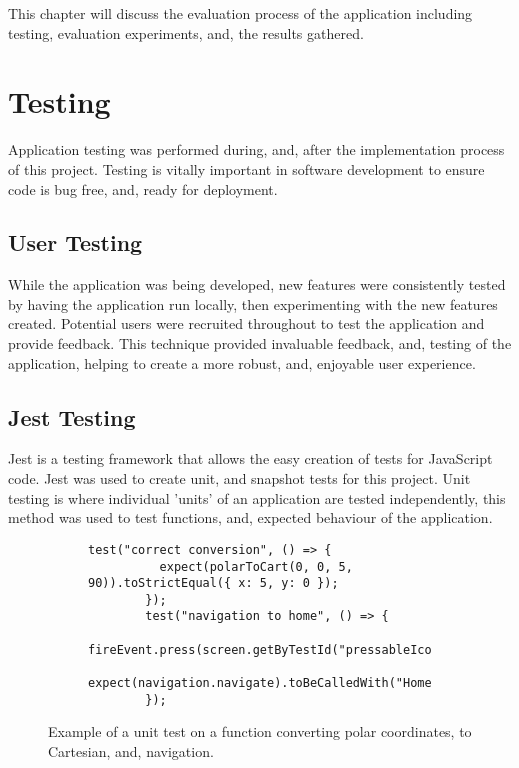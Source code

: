 This chapter will discuss the evaluation process of the application including testing, evaluation experiments, and, the results gathered.

\section{Testing}
Application testing was performed during, and, after the implementation process of this project. Testing is vitally important in software development to ensure code is bug free, and, ready for deployment.

\subsection{User Testing}
While the application was being developed, new features were consistently tested by having the application run locally, then experimenting with the new features created. Potential users were recruited throughout to test the application and provide feedback. This technique provided invaluable feedback, and, testing of the application, helping to create a more robust, and, enjoyable user experience.

\subsection{Jest Testing}
Jest is a testing framework that allows the easy creation of tests for JavaScript code. Jest was used to create unit, and snapshot tests for this project. Unit testing is where individual 'units' of an application are tested independently, this method was used to test functions, and, expected behaviour of the application. 

\begin{figure}[!htbp]
    \centering
    \begin{subfigure}[b]{0.8\textwidth}
        \begin{lstlisting}[language=jsJsx]
        test("correct conversion", () => {
          expect(polarToCart(0, 0, 5, 90)).toStrictEqual({ x: 5, y: 0 });
        });
        test("navigation to home", () => {
            fireEvent.press(screen.getByTestId("pressableIcon"));
            expect(navigation.navigate).toBeCalledWith("HomeScreen");
        });
        \end{lstlisting}
    \end{subfigure}
\caption[Example of a unit test]{Example of a unit test on a function converting polar coordinates, to Cartesian, and, navigation.}
\label{fig:jestUnit}
\end{figure}
\FloatBarrier

